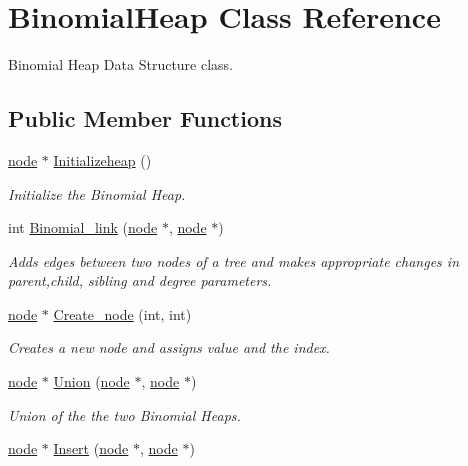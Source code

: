 \hypertarget{classBinomialHeap}{}\section{Binomial\+Heap Class Reference}
\label{classBinomialHeap}


Binomial Heap Data Structure class.  


\subsection*{Public Member Functions}
\begin{DoxyCompactItemize}
\item 
\hyperlink{structnode}{node} $\ast$ \hyperlink{classBinomialHeap_a3ffaab6756189d14dd76e4e7a48147b6}{Initializeheap} ()
\begin{DoxyCompactList}\small\item\em Initialize the Binomial Heap. \end{DoxyCompactList}\item 
int \hyperlink{classBinomialHeap_a657d892542f95da35f386fbe35564a35}{Binomial\+\_\+link} (\hyperlink{structnode}{node} $\ast$, \hyperlink{structnode}{node} $\ast$)
\begin{DoxyCompactList}\small\item\em Adds edges between two nodes of a tree and makes appropriate changes in parent,child, sibling and degree parameters. \end{DoxyCompactList}\item 
\hyperlink{structnode}{node} $\ast$ \hyperlink{classBinomialHeap_a1389155b4ab14754a43d0d27b67e20d0}{Create\+\_\+node} (int, int)
\begin{DoxyCompactList}\small\item\em Creates a new node and assigns value and the index. \end{DoxyCompactList}\item 
\hyperlink{structnode}{node} $\ast$ \hyperlink{classBinomialHeap_aea4c422323bcafcedb9168c86adadfa8}{Union} (\hyperlink{structnode}{node} $\ast$, \hyperlink{structnode}{node} $\ast$)
\begin{DoxyCompactList}\small\item\em Union of the the two Binomial Heaps. \end{DoxyCompactList}\item 
\hyperlink{structnode}{node} $\ast$ \hyperlink{classBinomialHeap_a762a7e29d6bea85540f1a82cbca4a062}{Insert} (\hyperlink{structnode}{node} $\ast$, \hyperlink{structnode}{node} $\ast$)

\end{DoxyCompactItemize}
